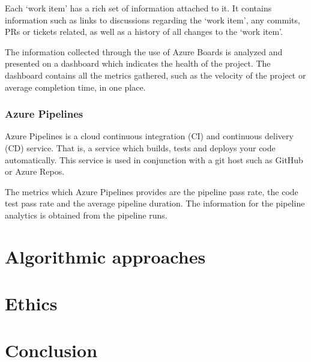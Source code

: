 \documentclass{article}
\begin{document}
Each `work item' has a rich set of information attached to it. It contains
information such as links to discussions regarding the `work item', any
commits, PRs or tickets related, as well as a history of all changes to the
`work item'.

The information collected through the use of Azure Boards is analyzed and
presented on a dashboard which indicates the health of the project. The
dashboard contains all the metrics gathered, such as the velocity of the
project or average completion time, in one place.~\cite{azure2020boards}

\subsubsection{Azure Pipelines}
Azure Pipelines is a cloud continuous integration (CI) and continuous delivery
(CD) service. That is, a service which builds, tests and deploys your code
automatically. This service is used in conjunction with a git host such as
GitHub or Azure Repos.

The metrics which Azure Pipelines provides are the pipeline pass rate, the code
test pass rate and the average pipeline duration. The information for the
pipeline analytics is obtained from the pipeline runs.

\section{Algorithmic approaches}

\section{Ethics}

\section{Conclusion}

\newpage



\end{document}
